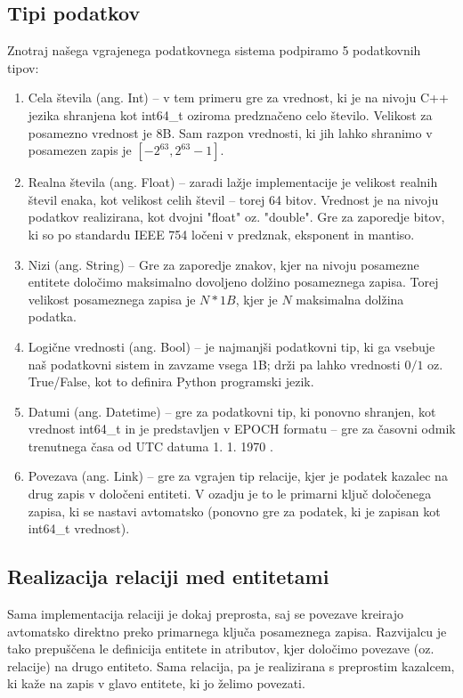 \documentclass[a4paper,12pt,openright]{book}
\begin{document}
        \subsection{Tipi podatkov}
        Znotraj našega vgrajenega podatkovnega sistema podpiramo 5 podatkovnih tipov:
        \begin{enumerate}
            \item Cela števila (ang. Int) – v tem primeru gre za vrednost, ki je na nivoju C++ jezika shranjena kot int64\_t oziroma predznačeno celo število. Velikost za posamezno vrednost je 8B. Sam razpon vrednosti, ki jih lahko shranimo v posamezen zapis je $[-2^{63}, 2^{63} - 1]$.
            \item Realna števila (ang. Float) – zaradi lažje implementacije je velikost realnih števil enaka, kot velikost celih števil – torej 64 bitov. Vrednost je na nivoju podatkov realizirana, kot dvojni "float" oz. "double". Gre za zaporedje bitov, ki so po standardu IEEE 754 \cite{kahan1996ieee} ločeni v predznak, eksponent in mantiso.
            \item Nizi (ang. String) – Gre za zaporedje znakov, kjer na nivoju posamezne entitete določimo maksimalno dovoljeno dolžino posameznega zapisa. Torej velikost posameznega zapisa je $N * 1B$, kjer je $N$ maksimalna dolžina podatka. 
            \item Logične vrednosti (ang. Bool) – je najmanjši podatkovni tip, ki ga vsebuje naš podatkovni sistem in zavzame vsega 1B; drži pa lahko vrednosti $0/1$ oz. True/False, kot to definira Python programski jezik.
            \item Datumi (ang. Datetime) – gre za podatkovni tip, ki ponovno shranjen, kot vrednost int64\_t in je predstavljen v EPOCH formatu – gre za časovni odmik trenutnega časa od UTC datuma 1. 1. 1970 \cite{EPOCH_FORMAT}. 
            \item Povezava (ang. Link) – gre za vgrajen tip relacije, kjer je podatek kazalec na drug zapis v določeni entiteti. V ozadju je to le primarni ključ določenega zapisa, ki se nastavi avtomatsko (ponovno gre za podatek, ki je zapisan kot int64\_t vrednost).
        \end{enumerate}
        
        \subsection{Realizacija relaciji med entitetami}

        Sama implementacija relaciji je dokaj preprosta, saj se povezave kreirajo avtomatsko direktno preko primarnega ključa posameznega zapisa. Razvijalcu je tako prepuščena le definicija entitete in atributov, kjer določimo povezave (oz. relacije) na drugo entiteto. Sama relacija, pa je realizirana s preprostim kazalcem, ki kaže na zapis v glavo entitete, ki jo želimo povezati.
\end{document}
